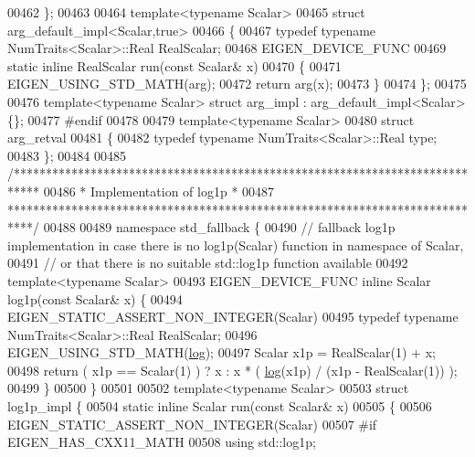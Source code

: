 \begin{DoxyCode}
00462   \};
00463 
00464   \textcolor{keyword}{template}<\textcolor{keyword}{typename} Scalar>
00465   \textcolor{keyword}{struct }arg\_default\_impl<Scalar,true>
00466   \{
00467     \textcolor{keyword}{typedef} \textcolor{keyword}{typename} NumTraits<Scalar>::Real RealScalar;
00468     EIGEN\_DEVICE\_FUNC
00469     \textcolor{keyword}{static} \textcolor{keyword}{inline} RealScalar run(\textcolor{keyword}{const} Scalar& x)
00470     \{
00471       EIGEN\_USING\_STD\_MATH(arg);
00472       \textcolor{keywordflow}{return} arg(x);
00473     \}
00474   \};
00475 
00476   \textcolor{keyword}{template}<\textcolor{keyword}{typename} Scalar> \textcolor{keyword}{struct }arg\_impl : arg\_default\_impl<Scalar> \{\};
00477 \textcolor{preprocessor}{#endif}
00478 
00479 \textcolor{keyword}{template}<\textcolor{keyword}{typename} Scalar>
00480 \textcolor{keyword}{struct }arg\_retval
00481 \{
00482   \textcolor{keyword}{typedef} \textcolor{keyword}{typename} NumTraits<Scalar>::Real type;
00483 \};
00484 
00485 \textcolor{comment}{/****************************************************************************}
00486 \textcolor{comment}{* Implementation of log1p                                                   *}
00487 \textcolor{comment}{****************************************************************************/}
00488 
00489 \textcolor{keyword}{namespace }std\_fallback \{
00490   \textcolor{comment}{// fallback log1p implementation in case there is no log1p(Scalar) function in namespace of Scalar,}
00491   \textcolor{comment}{// or that there is no suitable std::log1p function available}
00492   \textcolor{keyword}{template}<\textcolor{keyword}{typename} Scalar>
00493   EIGEN\_DEVICE\_FUNC \textcolor{keyword}{inline} Scalar log1p(\textcolor{keyword}{const} Scalar& x) \{
00494     EIGEN\_STATIC\_ASSERT\_NON\_INTEGER(Scalar)
00495     \textcolor{keyword}{typedef} \textcolor{keyword}{typename} NumTraits<Scalar>::Real RealScalar;
00496     EIGEN\_USING\_STD\_MATH(\hyperlink{structlog}{log});
00497     Scalar x1p = RealScalar(1) + x;
00498     \textcolor{keywordflow}{return} ( x1p == Scalar(1) ) ? x : x * ( \hyperlink{structlog}{log}(x1p) / (x1p - RealScalar(1)) );
00499   \}
00500 \}
00501 
00502 \textcolor{keyword}{template}<\textcolor{keyword}{typename} Scalar>
00503 \textcolor{keyword}{struct }log1p\_impl \{
00504   \textcolor{keyword}{static} \textcolor{keyword}{inline} Scalar run(\textcolor{keyword}{const} Scalar& x)
00505   \{
00506     EIGEN\_STATIC\_ASSERT\_NON\_INTEGER(Scalar)
00507     \textcolor{preprocessor}{#if EIGEN\_HAS\_CXX11\_MATH}
00508     \textcolor{keyword}{using} std::log1p;

\end{DoxyCode}
